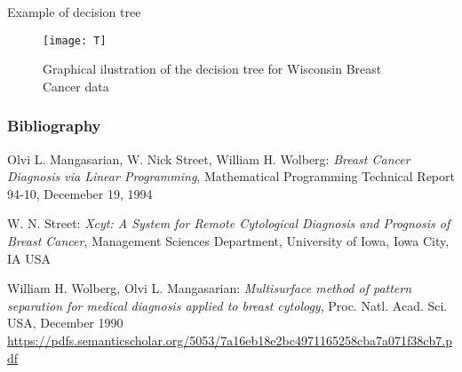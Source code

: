 \documentclass{beamer}
\begin{document}
\begin{frame}{Example of decision tree}

\begin{figure}[h]

	\caption{\textit{Multisurface Method Tree with MATLAB \url{http://pages.cs.wisc.edu/~olvi/uwmp/msmt.html}}}
	\texttt{[image: T]}
	\caption{Graphical ilustration of the decision tree for Wisconsin Breast Cancer data}
	
\end{figure}



\end{frame}














































































\begin{frame}
\frametitle{Bibliography}
\begin{thebibliography}{9}
Olvi L. Mangasarian, W. Nick Street, William H. Wolberg: \emph{Breast Cancer Diagnosis via Linear Programming}, Mathematical Programming Technical Report 94-10, Decemeber 19, 1994

W. N. Street: \emph{Xcyt: A System for Remote Cytological Diagnosis and Prognosis of Breast Cancer},
Management Sciences Department, University of Iowa, Iowa City, IA USA

William H. Wolberg, Olvi L. Mangasarian: \emph{Multisurface method of pattern separation for medical diagnosis applied to breast cytology}, Proc. Natl. Acad. Sci. USA, December 1990 \url{https://pdfs.semanticscholar.org/5053/7a16eb18e2bc4971165258cba7a071f38cb7.pdf}

\end{thebibliography}
\end{frame}
\end{document}
